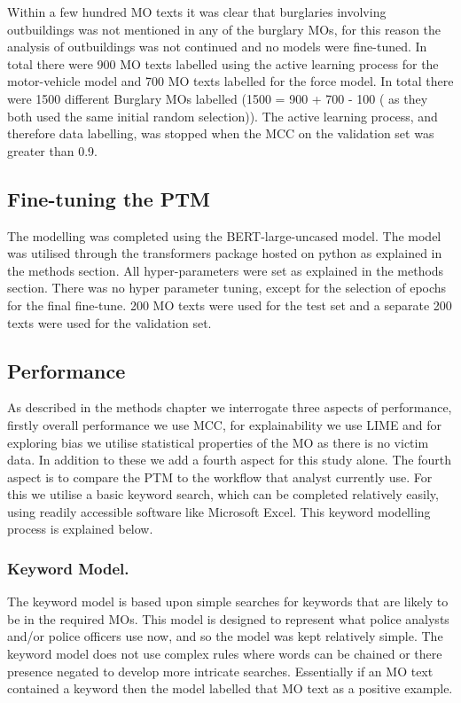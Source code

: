 Within a few hundred MO texts it was clear that burglaries involving outbuildings was not mentioned in any of the burglary MOs, for this reason the analysis of outbuildings was not continued and no models were fine-tuned. In total there were 900 MO texts labelled using the active learning process for the motor-vehicle model and 700 MO texts labelled for the force model. In total there were 1500 different Burglary MOs labelled (1500 = 900 + 700 - 100 ( as they both used the same initial random selection)). The active learning process, and therefore data labelling, was stopped when the MCC on the validation set was greater than 0.9.

\subsection{Fine-tuning the PTM} The modelling was completed using the BERT-large-uncased model. The model was utilised through the transformers package hosted on python as explained in the methods section. All hyper-parameters were set as explained in the methods section. There was no hyper parameter tuning, except for the selection of epochs for the final fine-tune. 200 MO texts were used for the test set and a separate 200 texts were used for the validation set.  

\subsection{Performance} As described in the methods chapter we interrogate three aspects of performance, firstly overall performance we use MCC, for explainability we use LIME and for exploring bias we utilise statistical properties of the MO as there is no victim data. In addition to these we add a fourth aspect for this study alone. The fourth aspect is to compare the PTM to the workflow that analyst currently use. For this we utilise a basic keyword search, which can be completed relatively easily, using readily accessible software like Microsoft Excel.  This keyword modelling process is explained below.

\subsubsection{Keyword Model.} The keyword model is based upon simple searches for keywords that are likely to be in the required MOs. This model is designed to represent what police analysts and/or police officers use now, and so the model was kept relatively simple. The keyword model does not use complex rules where words can be chained or there presence negated to develop more intricate searches. Essentially if an MO text contained a keyword then the model labelled that MO text as a positive example. 

